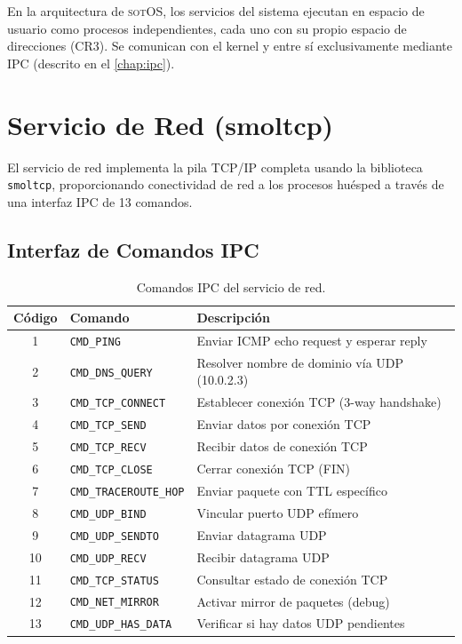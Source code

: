 \documentclass[11pt,twoside,openright]{book}
\theoremstyle{definition}
\theoremstyle{plain}
\theoremstyle{remark}
\newcommand{\sotos}{\textsc{sotOS}}
\begin{document}
En la arquitectura de \sotos{}, los servicios del sistema ejecutan en espacio
de usuario como procesos independientes, cada uno con su propio espacio de
direcciones (CR3). Se comunican con el kernel y entre sí exclusivamente
mediante IPC (descrito en el \cref{chap:ipc}).

\section{Servicio de Red (smoltcp)}
\label{sec:net-service}

El servicio de red implementa la pila TCP/IP completa usando la biblioteca
\texttt{smoltcp}, proporcionando conectividad de red a los procesos huésped
a través de una interfaz IPC de 13 comandos.

\subsection{Interfaz de Comandos IPC}

\begin{table}[ht]
\centering
\caption{Comandos IPC del servicio de red.}
\label{tab:net-commands}
\begin{tabular}{@{}clp{7.5cm}@{}}
\toprule
\textbf{Código} & \textbf{Comando} & \textbf{Descripción} \\
\midrule
1  & \texttt{CMD\_PING}          & Enviar ICMP echo request y esperar reply \\
2  & \texttt{CMD\_DNS\_QUERY}    & Resolver nombre de dominio vía UDP (10.0.2.3) \\
3  & \texttt{CMD\_TCP\_CONNECT}  & Establecer conexión TCP (3-way handshake) \\
4  & \texttt{CMD\_TCP\_SEND}     & Enviar datos por conexión TCP \\
5  & \texttt{CMD\_TCP\_RECV}     & Recibir datos de conexión TCP \\
6  & \texttt{CMD\_TCP\_CLOSE}    & Cerrar conexión TCP (FIN) \\
7  & \texttt{CMD\_TRACEROUTE\_HOP} & Enviar paquete con TTL específico \\
8  & \texttt{CMD\_UDP\_BIND}     & Vincular puerto UDP efímero \\
9  & \texttt{CMD\_UDP\_SENDTO}   & Enviar datagrama UDP \\
10 & \texttt{CMD\_UDP\_RECV}     & Recibir datagrama UDP \\
11 & \texttt{CMD\_TCP\_STATUS}   & Consultar estado de conexión TCP \\
12 & \texttt{CMD\_NET\_MIRROR}   & Activar mirror de paquetes (debug) \\
13 & \texttt{CMD\_UDP\_HAS\_DATA} & Verificar si hay datos UDP pendientes \\
\bottomrule
\end{tabular}
\end{table}
\end{document}

